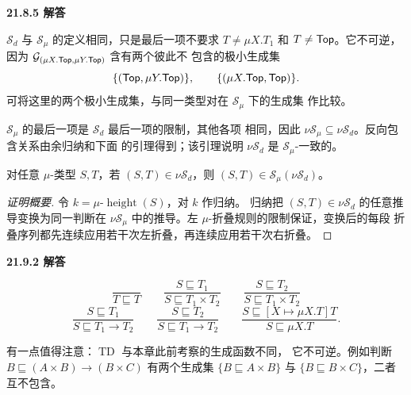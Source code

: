 \begin{taplauthorsolutionentrybox}
\label{sol:author:21.8.5}
\textbf{21.8.5 解答}

\(\mathcal S_d\) 与 \(\mathcal S_\mu\) 的定义相同，只是最后一项不要求
\(T\ne\mu X.T_1\) 和 \(T\ne\mathsf{Top}\)。它不可逆，因为
\(\mathcal G_{(\mu X.\mathsf{Top},\mu Y.\mathsf{Top})}\) 含有两个彼此不
包含的极小生成集
\[
\{(\mathsf{Top},\mu Y.\mathsf{Top})\},\qquad
\{(\mu X.\mathsf{Top},\mathsf{Top})\}.
\]
可将这里的两个极小生成集，与同一类型对在 \(\mathcal S_\mu\) 下的生成集
作比较。

\(\mathcal S_\mu\) 的最后一项是 \(\mathcal S_d\) 最后一项的限制，其他各项
相同，因此
\(\nu\mathcal S_\mu\subseteq\nu\mathcal S_d\)。反向包含关系由余归纳和下面
的引理得到；该引理说明 \(\nu\mathcal S_d\) 是
\(\mathcal S_\mu\)-一致的。

\setcounter{taplappendixlemma}{16}
\begin{taplappendixlemma}
\label{lem:a.17}
对任意 \(\mu\)-类型 \(S,T\)，若
\((S,T)\in\nu\mathcal S_d\)，则
\((S,T)\in\mathcal S_\mu(\nu\mathcal S_d)\)。
\end{taplappendixlemma}

\begin{proof}[证明概要]
令 \(k=\mu\text{-}\operatorname{height}(S)\)，对 \(k\) 作归纳。
归纳把
\((S,T)\in\nu\mathcal S_d\) 的任意推导变换为同一判断在
\(\nu\mathcal S_\mu\) 中的推导。左 \(\mu\)-折叠规则的限制保证，变换后的每段
折叠序列都先连续应用若干次左折叠，再连续应用若干次右折叠。
\end{proof}


\end{taplauthorsolutionentrybox}

\begin{taplauthorsolutionentrybox}
\label{sol:author:21.9.2}
\textbf{21.9.2 解答}

\[
\frac{}{T\sqsubseteq T}
\qquad
\frac{S\sqsubseteq T_1}{S\sqsubseteq T_1\times T_2}
\qquad
\frac{S\sqsubseteq T_2}{S\sqsubseteq T_1\times T_2}
\]
\[
\frac{S\sqsubseteq T_1}{S\sqsubseteq T_1\to T_2}
\qquad
\frac{S\sqsubseteq T_2}{S\sqsubseteq T_1\to T_2}
\qquad
\frac{S\sqsubseteq[X\mapsto\mu X.T]T}{S\sqsubseteq\mu X.T}.
\]

有一点值得注意：\(\operatorname{TD}\) 与本章此前考察的生成函数不同，
它不可逆。例如判断
\(B\sqsubseteq(A\times B)\to(B\times C)\) 有两个生成集
\(\{B\sqsubseteq A\times B\}\) 与
\(\{B\sqsubseteq B\times C\}\)，二者互不包含。

\end{taplauthorsolutionentrybox}

